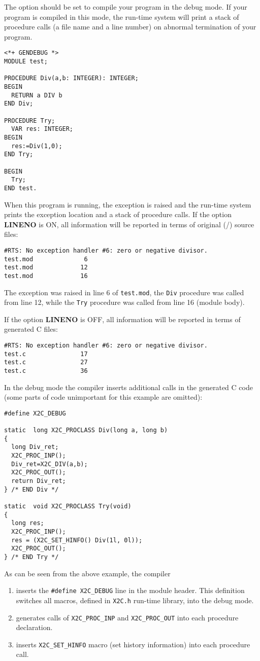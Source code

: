 The  option should be set
to compile your program in the debug mode. If your program is compiled
in this mode, the run-time system will print a stack of procedure calls
(a file name and a line number) on abnormal termination of your program.

\Example
\begin{verbatim}
<*+ GENDEBUG *>
MODULE test;

PROCEDURE Div(a,b: INTEGER): INTEGER;
BEGIN
  RETURN a DIV b
END Div;

PROCEDURE Try;
  VAR res: INTEGER;
BEGIN
  res:=Div(1,0);
END Try;

BEGIN
  Try;
END test.
\end{verbatim}

\noindent
When this program is running, the exception is raised and the
run-time system prints the exception location and a stack of
procedure calls.  If the option {\bf LINENO} is ON, all information
will be reported in terms of original (\ot{}/\mt{}) source files:
\begin{verbatim}
#RTS: No exception handler #6: zero or negative divisor.
test.mod              6
test.mod             12
test.mod             16
\end{verbatim}
The exception was raised in line 6 of {\tt test.mod},
the {\tt Div} procedure was called from line 12,
while the {\tt Try} procedure was called from line 16
(module body).

If the option {\bf LINENO} is OFF, all information will be reported in
terms of generated C files:
\begin{verbatim}
#RTS: No exception handler #6: zero or negative divisor.
test.c               17
test.c               27
test.c               36
\end{verbatim}

In the debug mode the compiler inserts additional calls in the generated
C code (some parts of code unimportant for this example are omitted):
\begin{verbatim}
#define X2C_DEBUG

static  long X2C_PROCLASS Div(long a, long b)
{
  long Div_ret;
  X2C_PROC_INP();
  Div_ret=X2C_DIV(a,b);
  X2C_PROC_OUT();
  return Div_ret;
} /* END Div */

static  void X2C_PROCLASS Try(void)
{
  long res;
  X2C_PROC_INP();
  res = (X2C_SET_HINFO() Div(1l, 0l));
  X2C_PROC_OUT();
} /* END Try */
\end{verbatim}
As can be seen from the above example, the compiler
\begin{enumerate}
\item
        inserts the \verb|#define X2C_DEBUG| line in the module header.
        This definition switches all macros,
        defined in {\tt X2C.h} run-time library, into the debug mode.

\item
        generates calls of \verb|X2C_PROC_INP| and \verb|X2C_PROC_OUT|
        into each procedure declaration.

\item
        inserts \verb|X2C_SET_HINFO| macro (set history information)
        into each procedure call.

\end{enumerate}

